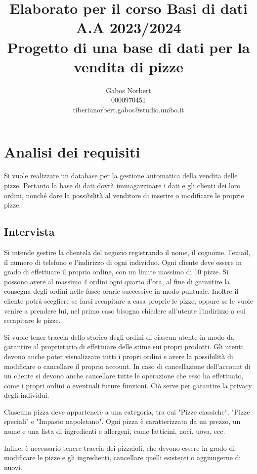 \documentclass[a4paper,12pt, oneside]{article}
\title{\textbf{Elaborato per il corso Basi di dati} \\ \large A.A 2023/2024 \\ Progetto di una base di dati per la vendita di pizze}
\author{Gabos Norbert \\ 0000970451 \\ tiberiunorbert.gabos@studio.unibo.it }
\date{}
\begin{document}
\maketitle

\newpage
\tableofcontents{}
\newpage

\section{Analisi dei requisiti}

Si vuole realizzare un database per la gestione automatica della vendita
delle pizze. Pertanto la base di dati dovrà immagazzinare i dati e gli
clienti dei loro ordini, nonché dare la possibilità al venditore di
inserire o modificare le proprie pizze.

\subsection{Intervista}

Si intende gestire la clientela del negozio registrando il nome, il
cognome, l'email, il numero di telefono e l'indirizzo di ogni individuo. Ogni
cliente deve essere in grado di effettuare il proprio ordine, con un
limite massimo di 10 pizze. Si possono avere al massimo 4 ordini ogni
quarto d'ora, al fine di garantire la consegna degli ordini nelle
fasce orarie successive in modo puntuale.
Inoltre il cliente potrà scegliere se farsi recapitare a casa proprie
le pizze, oppure se le vuole venire a prendere lui, nel primo caso
bisogna chiedere all'utente l'indirizzo a cui recapitare le pizze.

Si vuole tener traccia dello storico degli ordini di ciascun utente in
modo da garantire al proprietario di effettuare delle stime sui propri
prodotti. Gli utenti devono anche poter visualizzare tutti i propri
ordini e avere la possibilità di modificare o cancellare il proprio
account. In caso di cancellazione dell'account di un cliente si devono
anche cancellare tutte le operazione che esso ha effettuato, come i
propri ordini o eventuali future funzioni. Ciò serve per garantire la
privacy degli individui.

Ciascuna pizza deve appartenere a una categoria, tra cui "Pizze
classiche", "Pizze speciali" e "Impasto napoletano". Ogni pizza è
caratterizzata da un prezzo, un nome e una lista di ingredienti e
allergeni, come latticini, noci, uova, ecc.

Infine, è necessario tenere traccia dei pizzaioli, che devono essere
in grado di modificare le pizze e gli ingredienti, cancellare quelli
esistenti o aggiungerne di nuovi.
\end{document}
